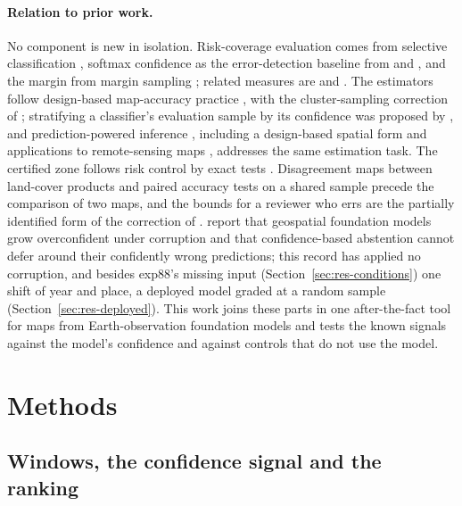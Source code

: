 \documentclass[11pt,a4paper]{article}
\begin{document}
\paragraph{Relation to prior work.} No component is new in isolation. Risk-coverage evaluation comes from selective
classification \citep{chow1970,geifman2017,geifman2019}, softmax confidence as the error-detection baseline from
\citet{hendrycks2017} and \citet{jaeger2023}, and the margin from margin sampling \citep{scheffer2001,lewis1994}; related
measures are \citet{rottmann2020} and \citet{meyer2021}. The estimators follow design-based map-accuracy practice
\citep{olofsson2014,stehman2019}, with the cluster-sampling correction of \citet{stehman1997}; stratifying a classifier's
evaluation sample by its confidence was proposed by \citet{kumar2016}, and prediction-powered inference
\citep{angelopoulos2023ppi}, including a design-based spatial form \citep{shirota2026} and applications to
remote-sensing maps \citep{lu2024regression}, addresses the same estimation
task. The certified zone follows risk control by exact tests \citep{bates2021,angelopoulos2021}. Disagreement maps
between land-cover products \citep{fritz2008} and paired accuracy tests on a shared sample \citep{foody2004} precede the
comparison of two maps, and the bounds for a reviewer who errs are the partially identified form of the correction of
\citet{rogan1978}. \citet{lehmann2026} report that geospatial foundation models grow overconfident under corruption
and that confidence-based abstention cannot defer around their confidently wrong predictions; this record has applied
no corruption, and besides exp88's missing input (Section~\ref{sec:res-conditions}) one shift of year and place, a
deployed model graded at a random sample (Section~\ref{sec:res-deployed}). This work joins these parts in one after-the-fact tool
for maps from Earth-observation foundation models and tests the known signals against the model's confidence and
against controls that do not use the model.

\section{Methods}
\label{sec:methods}

\subsection{Windows, the confidence signal and the ranking}
\label{sec:ranking}
\end{document}
